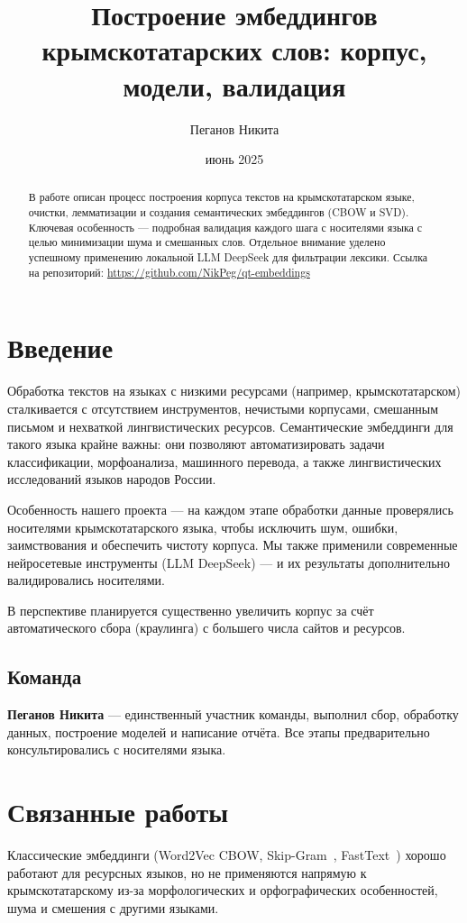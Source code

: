 \documentclass{article}
\title{Построение эмбеддингов крымскотатарских слов: корпус, модели, валидация}
\author{Пеганов Никита}
\date{июнь 2025}
\begin{document}
\maketitle
\begin{abstract}
    В работе описан процесс построения корпуса текстов на крымскотатарском языке, очистки, лемматизации и создания семантических эмбеддингов (CBOW и SVD). Ключевая особенность — подробная валидация каждого шага с носителями языка с целью минимизации шума и смешанных слов. Отдельное внимание уделено успешному применению локальной LLM DeepSeek для фильтрации лексики. Ссылка на репозиторий: \url{https://github.com/NikPeg/qt-embeddings}
\end{abstract}

\section{Введение}
Обработка текстов на языках с низкими ресурсами (например, крымскотатарском) сталкивается с отсутствием инструментов, нечистыми корпусами, смешанным письмом и нехваткой лингвистических ресурсов. Семантические эмбеддинги для такого языка крайне важны: они позволяют автоматизировать задачи классификации, морфоанализа, машинного перевода, а также лингвистических исследований языков народов России.

Особенность нашего проекта — на каждом этапе обработки данные проверялись носителями крымскотатарского языка, чтобы исключить шум, ошибки, заимствования и обеспечить чистоту корпуса. Мы также применили современные нейросетевые инструменты (LLM DeepSeek) — и их результаты дополнительно валидировались носителями.

В перспективе планируется существенно увеличить корпус за счёт автоматического сбора (краулинга) с большего числа сайтов и ресурсов.

\subsection{Команда}
\textbf{Пеганов Никита} — единственный участник команды, выполнил сбор, обработку данных, построение моделей и написание отчёта. Все этапы предварительно консультировались с носителями языка.

\section{Связанные работы}
\label{sec:related}
Классические эмбеддинги (Word2Vec CBOW, Skip-Gram~\cite{mikolov2013distributed}, FastText~\cite{bojanowski2017enriching}) хорошо работают для ресурсных языков, но не применяются напрямую к крымскотатарскому из-за морфологических и орфографических особенностей, шума и смешения с другими языками.
\end{document}
